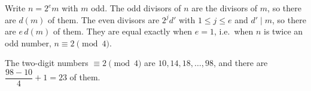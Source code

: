 Write $n=2^e m$ with $m$ odd. The odd divisors of $n$ are the divisors of $m$, so there are $d(m)$ of them. The even divisors are $2^j d'$ with $1\le j\le e$ and $d'\mid m$, so there are $e\,d(m)$ of them. They are equal exactly when $e=1$, i.e.\ when $n$ is twice an odd number, $n\equiv2\pmod4$.

The two-digit numbers $\equiv2\pmod4$ are $10,14,18,\dots,98$, and there are $\dfrac{98-10}{4}+1=\boxed{23}$ of them.
